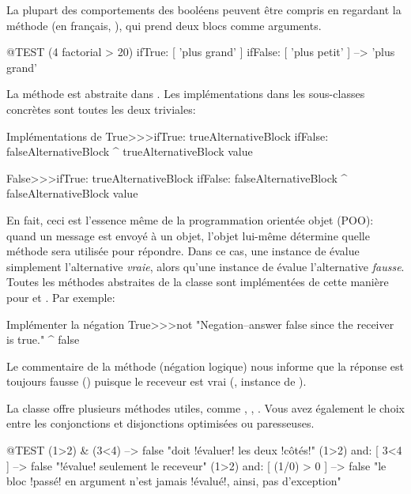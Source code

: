 \documentclass[a4paper,10pt,twoside]{book}
\begin{document}
La plupart des comportements des booléens peuvent être compris en
regardant la méthode  (en
français, ), qui prend deux blocs
comme arguments.

\begin{code}{@TEST}
(4 factorial > 20) ifTrue: [ 'plus grand' ] ifFalse: [ 'plus petit' ] --> 'plus grand'
\end{code}

La méthode est abstraite dans .
Les implémentations dans les sous-classes concrètes sont toutes les deux triviales:

\begin{method}{Implémentations de }
True>>>ifTrue: trueAlternativeBlock ifFalse: falseAlternativeBlock 
    ^ trueAlternativeBlock value

False>>>ifTrue: trueAlternativeBlock ifFalse: falseAlternativeBlock 
    ^ falseAlternativeBlock value
\end{method}

En fait, ceci est l'essence même de la programmation orientée
objet (POO): quand un message est envoyé à un objet, l'objet
lui-même détermine quelle méthode sera utilisée pour
répondre. Dans ce cas, une instance de   évalue
simplement l'alternative \emph{vraie}, alors qu'une instance de
 évalue l'alternative \emph{fausse}. Toutes les méthodes 
abstraites de la classe  sont implémentées de cette 
manière pour  et . Par exemple:

\begin{method}{Implémenter la négation}
True>>>not
    "Negation--answer false since the receiver is true."
    ^ false
\end{method}

Le commentaire de la méthode  (négation logique) nous informe que
la réponse est toujours fausse () puisque le receveur est
vrai (, instance de ).

La classe  offre plusieurs méthodes utiles, comme , , . Vous avez également le choix entre les conjonctions et disjonctions optimisées ou paresseuses.

\begin{code}{@TEST}
(1>2) & (3<4)              --> false     "doit !évaluer! les deux !côtés!"
(1>2) and: [ 3<4 ]        --> false     "!évalue! seulement le receveur"
(1>2) and: [ (1/0) > 0 ] --> false    "le bloc !passé! en argument n'est jamais !évalué!, ainsi, pas d'exception"
\end{code}
\end{document}
